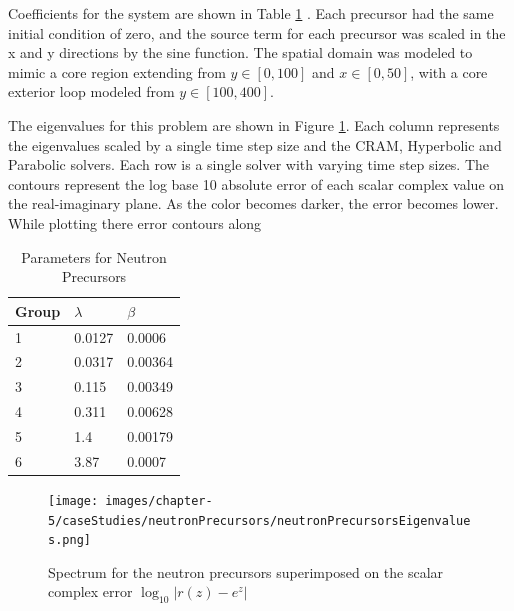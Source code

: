 Coefficients for the system are shown in Table \ref{tab:precursorCoeffs} \cite{ott1985}. 
Each precursor had the same initial condition of zero, and the source term for each precursor was scaled in the x and y directions by the sine function. The spatial domain was modeled to mimic a core region extending from $y \in [0,100]$ and $x \in [0,50]$, with a core exterior loop modeled from $y \in [100, 400]$. 

The eigenvalues for this problem are shown in Figure \ref{fig:spectrum_neutron_precursors}. Each column represents the eigenvalues scaled by a single time step size and the CRAM, Hyperbolic and Parabolic solvers. Each row is a single solver with varying time step sizes. The contours represent the log base 10 absolute error of each scalar complex value on the real-imaginary plane. As the color becomes darker, the error becomes lower. While plotting there error contours along 

\clearpage

\begin{table}[p]
   \caption{\label{tab:precursorCoeffs} Parameters for Neutron Precursors}
   \centering
   \begin{tabular}{lll}
   \hline
   Group & $\lambda$ & $\beta$ \\
   \hline
   1 & 0.0127 & 0.0006 \\
   2 & 0.0317 & 0.00364 \\
   3 & 0.115 & 0.00349 \\
   4 & 0.311& 0.00628 \\
   5 & 1.4 & 0.00179\\
   6 & 3.87 & 0.0007 \\
   \hline
   \end{tabular}
\end{table} 

\clearpage

\begin{landscape}
\thispagestyle{mylandscape}
\begin{figure}[p]
    \centering
    \texttt{[image: images/chapter-5/caseStudies/neutronPrecursors/neutronPrecursorsEigenvalues.png]}
    \caption{Spectrum for the neutron precursors superimposed on the scalar complex error $\log_{10}|r(z)-e^{z}|$}
    \label{fig:spectrum_neutron_precursors}
\end{figure}
\end{landscape}

\clearpage

